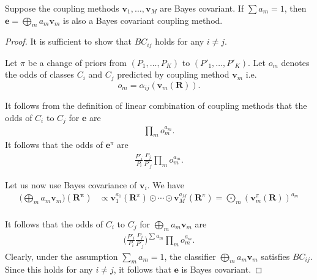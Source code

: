 \begin{prop}
	\label{prop:ensemble}
Suppose the coupling methods $\boldsymbol{v}_1, \ldots, \boldsymbol{v}_M$ are Bayes covariant. If $\sum a_m = 1$, then $\boldsymbol{e} = \bigoplus_m a_m \boldsymbol{v}_m$ is also a Bayes covariant coupling method.
\end{prop}

\begin{proof}
It is sufficient to show that $BC_{ij}$ holds for any $i\not= j$. 

Let $\pi$ be a change of priors from $(P_1, \ldots, P_K)$  to $(P'_1, \ldots, P'_K)$. Let $o_m$ denotes the odds of classes $C_i$ and $C_j$ predicted by coupling method $\boldsymbol{v}_m$ i.e.
$$
o_m = \alpha_{ij}(\boldsymbol{v}_m(\boldsymbol{R})).
$$

It follows from the definition of linear combination of coupling methods that the odds of $C_i$ to $C_j$ for $\boldsymbol{e}$ are
\begin{align}
\prod_m o_m^{a_m}.
\end{align}
It follows that the odds of $\boldsymbol{e}^\pi$ are 
\begin{align}
\frac{P'_i}{P_i} \frac{P_j}{P'_j} \prod_m o_m^{a_m}.
\end{align}

Let us now use Bayes covariance of $\boldsymbol{v}_i$. 
We have
\begin{align}
	\biggl(\bigoplus_m a_m \boldsymbol{v}_m\biggr)(\boldsymbol{R^\pi}) & \propto 
	\boldsymbol{v}_1^{a_1}(\boldsymbol{R}^\pi) \odot \cdots \odot \boldsymbol{v}_M^{a_M}(\boldsymbol{R}^\pi) =  \bigodot_m  (\boldsymbol{v}_m^\pi(\boldsymbol{R}))^{a_m} \\
\end{align}

It follows that the odds of $C_i$ to $C_j$ for $\bigoplus_m a_m \boldsymbol{v}_m$ are 
\begin{align}
\biggl(\frac{P'_i}{P_i} \frac{P_j}{P'_j} \biggr)^{\sum a_m} \prod_m o_m^{a_m}.
\end{align}
Clearly, under the assumption $\sum_m a_m = 1$, the classifier $\bigoplus_m a_m \boldsymbol{v}_m$ satisfies $BC_{ij}$. Since this holds for any $i\not=j$,  it follows that $\boldsymbol{e}$ is Bayes covariant.
\end{proof}


% 


